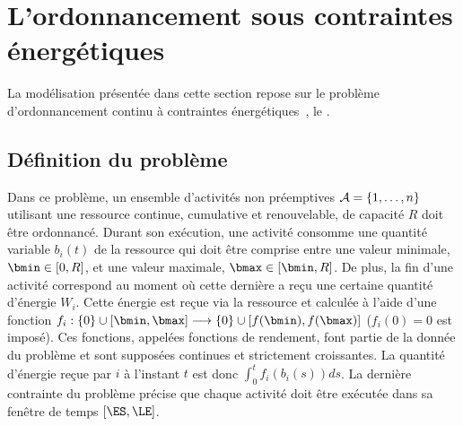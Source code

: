 
\section{L'ordonnancement sous contraintes énergétiques}
\label{sec:ordo_nrj} 
La modélisation présentée dans cette section repose sur le problème
d'ordonnancement continu à contraintes
énergétiques~\cite{ArtiguesLopez}, le \CECSP.

\subsection{Définition du problème}

Dans ce problème, un ensemble d'activités non préemptives
${\cal A}=\{1,\dots,n\}$ utilisant une ressource continue, cumulative et
renouvelable, de capacité $R$ doit être ordonnancé. Durant son
exécution, une activité consomme une quantité variable $b_i(t)$ de la
ressource qui doit être comprise entre une valeur minimale, $\bmin \in
[0,R]$, et une valeur maximale, $\bmax \in [\bmin,R]$. De plus, la fin
d'une activité correspond au moment où cette dernière a reçu une
certaine quantité d'énergie $W_i$. Cette énergie est reçue via la
ressource et calculée à l'aide d'une fonction $f_i: \{0\} \cup
[\bmin,\bmax]\longrightarrow\{0\} \cup [f(\bmin),f(\bmax)]$
($f_i(0)=0$ est imposé). Ces fonctions, appelées fonctions de
rendement, font partie de la donnée du problème et sont supposées
continues et strictement croissantes. La quantité d'énergie reçue par
$i$ à l'instant $t$ est donc $\int_{0}^t f_i(b_i(s))ds$. La dernière
contrainte du problème précise que chaque activité doit être exécutée
dans sa fenêtre de temps $[\ES,\LE]$. 

